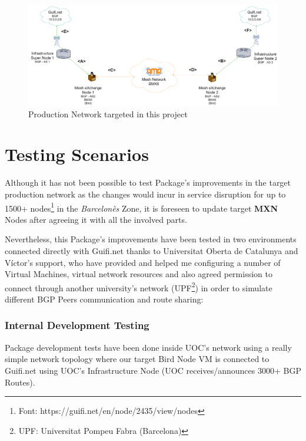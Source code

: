 \begin{landscape}

\begin{figure}[ht!]
    \centering
    \includegraphics[width=\hsize]{images/targetnet}
    \caption{Production Network targeted in this project}
    \label{fig:tarnet}
\end{figure}
\end{landscape}
\newpage

\section{Testing Scenarios}
Although it has not been possible to test Package's improvements in the target production network as the changes would incur in service disruption for up to 1500+ nodes\footnote{Font: https://guifi.net/en/node/2435/view/nodes} in the \textit{Barcelon\`{e}s} Zone, it is foreseen to update target \textbf{MXN} Nodes after agreeing it with all the involved parts.

Nevertheless, this Package's improvements have been tested in two environments connected directly with Guifi.net thanks to  Universitat Oberta de Catalunya and V\'{i}ctor's support, who have provided and helped me configuring a number of Virtual Machines, virtual network resources and also agreed permission to connect through another university's network (UPF\footnote{UPF: Universitat Pompeu Fabra (Barcelona)}) in order to simulate different BGP Peers communication and route sharing: 

\subsubsection{Internal Development Testing}
Package development tests have been done inside UOC's network using a really simple network topology where our target Bird Node VM is connected to Guifi.net using UOC's Infrastructure Node (UOC receives/announces 3000+ BGP Routes). 


